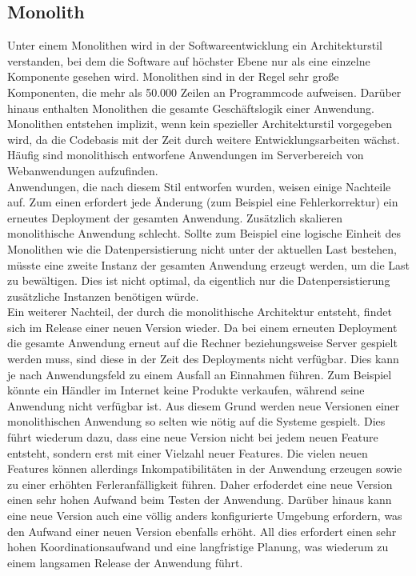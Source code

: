 \subsection{Monolith}
Unter einem Monolithen wird in der Softwareentwicklung ein Architekturstil verstanden, bei dem die Software auf höchster Ebene nur als eine einzelne Komponente gesehen wird. Monolithen sind in der Regel sehr große Komponenten, die mehr als 50.000 Zeilen an Programmcode aufweisen. Darüber hinaus enthalten Monolithen die gesamte Geschäftslogik einer Anwendung. Monolithen entstehen implizit, wenn kein spezieller Architekturstil vorgegeben wird, da die Codebasis mit der Zeit durch weitere Entwicklungsarbeiten wächst. Häufig sind monolithisch entworfene Anwendungen im Serverbereich von Webanwendungen aufzufinden. \\
Anwendungen, die nach diesem Stil entworfen wurden, weisen einige Nachteile auf. Zum einen erfordert jede Änderung (zum Beispiel eine Fehlerkorrektur) ein erneutes Deployment der gesamten Anwendung. Zusätzlich skalieren monolithische Anwendung schlecht. Sollte zum Beispiel eine logische Einheit des Monolithen wie die Datenpersistierung nicht unter der aktuellen Last bestehen, müsste eine zweite Instanz der gesamten Anwendung erzeugt werden, um die Last zu bewältigen. Dies ist nicht optimal, da eigentlich nur die Datenpersistierung zusätzliche Instanzen benötigen würde. \\
Ein weiterer Nachteil, der durch die monolithische Architektur entsteht, findet sich im Release einer neuen Version wieder. Da bei einem erneuten Deployment die gesamte Anwendung erneut auf die Rechner beziehungsweise Server gespielt werden muss, sind diese in der Zeit des Deployments nicht verfügbar. Dies kann je nach Anwendungsfeld zu einem Ausfall an Einnahmen führen. Zum Beispiel könnte ein Händler im Internet keine Produkte verkaufen, während seine Anwendung nicht verfügbar ist. Aus diesem Grund werden neue Versionen einer monolithischen Anwendung so selten wie nötig auf die Systeme gespielt. Dies führt wiederum dazu, dass eine neue Version nicht bei jedem neuen Feature entsteht, sondern erst mit einer Vielzahl neuer Features. Die vielen neuen Features können allerdings Inkompatibilitäten in der Anwendung erzeugen sowie zu einer erhöhten Ferleranfälligkeit führen. Daher erfoderdet eine neue Version einen sehr hohen Aufwand beim Testen der Anwendung. Darüber hinaus kann eine neue Version auch eine völlig anders konfigurierte Umgebung erfordern, was den Aufwand einer neuen Version ebenfalls erhöht. All dies erfordert einen sehr hohen Koordinationsaufwand und eine langfristige Planung, was wiederum zu einem langsamen Release der Anwendung führt.